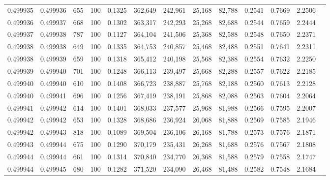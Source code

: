 \begin{tabular}{rrrrrrrrrrrrr}
0.499935 & 0.499936 &   655 & 100 &                                     0.1325 & 362,649 & 242,961 &  25,168 &  82,788 & 0.2541 & 0.7669 & 2.2506 \\
0.499936 & 0.499937 &   668 & 100 &                                     0.1302 & 363,317 & 242,293 &  25,268 &  82,688 & 0.2544 & 0.7659 & 2.2444 \\
0.499937 & 0.499938 &   787 & 100 &                                     0.1127 & 364,104 & 241,506 &  25,368 &  82,588 & 0.2548 & 0.7650 & 2.2371 \\
0.499938 & 0.499938 &   649 & 100 &                                     0.1335 & 364,753 & 240,857 &  25,468 &  82,488 & 0.2551 & 0.7641 & 2.2311 \\
0.499938 & 0.499939 &   659 & 100 &                                     0.1318 & 365,412 & 240,198 &  25,568 &  82,388 & 0.2554 & 0.7632 & 2.2250 \\
0.499939 & 0.499940 &   701 & 100 &                                     0.1248 & 366,113 & 239,497 &  25,668 &  82,288 & 0.2557 & 0.7622 & 2.2185 \\
0.499940 & 0.499940 &   610 & 100 &                                     0.1408 & 366,723 & 238,887 &  25,768 &  82,188 & 0.2560 & 0.7613 & 2.2128 \\
0.499940 & 0.499941 &   696 & 100 &                                     0.1256 & 367,419 & 238,191 &  25,868 &  82,088 & 0.2563 & 0.7604 & 2.2064 \\
0.499941 & 0.499942 &   614 & 100 &                                     0.1401 & 368,033 & 237,577 &  25,968 &  81,988 & 0.2566 & 0.7595 & 2.2007 \\
0.499942 & 0.499942 &   653 & 100 &                                     0.1328 & 368,686 & 236,924 &  26,068 &  81,888 & 0.2569 & 0.7585 & 2.1946 \\
0.499942 & 0.499943 &   818 & 100 &                                     0.1089 & 369,504 & 236,106 &  26,168 &  81,788 & 0.2573 & 0.7576 & 2.1871 \\
0.499943 & 0.499944 &   675 & 100 &                                     0.1290 & 370,179 & 235,431 &  26,268 &  81,688 & 0.2576 & 0.7567 & 2.1808 \\
0.499944 & 0.499944 &   661 & 100 &                                     0.1314 & 370,840 & 234,770 &  26,368 &  81,588 & 0.2579 & 0.7558 & 2.1747 \\
0.499944 & 0.499945 &   680 & 100 &                                     0.1282 & 371,520 & 234,090 &  26,468 &  81,488 & 0.2582 & 0.7548 & 2.1684 \\

\end{tabular}
